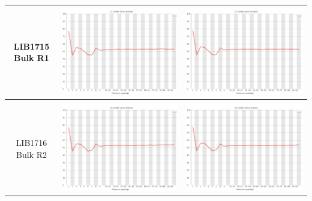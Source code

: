 \begin{center}
\begin{tabular}{ccc}
\begin{sideways}LIB1715 Bulk R1\end{sideways} & \includegraphics[width=0.4 \textwidth]{Appendices/images/Sample_LIB1715_base_gc_R1.png} & \includegraphics[width=0.4 \textwidth]{Appendices/images/Sample_LIB1715_base_gc_R2.png} \\ \midrule  \\
\begin{sideways}LIB1716 Bulk R2\end{sideways} & \includegraphics[width=0.4 \textwidth]{Appendices/images/Sample_LIB1716_base_gc_R1.png} & \includegraphics[width=0.4 \textwidth]{Appendices/images/Sample_LIB1716_base_gc_R2.png} \\ \midrule 
\end{tabular}
\end{center}

